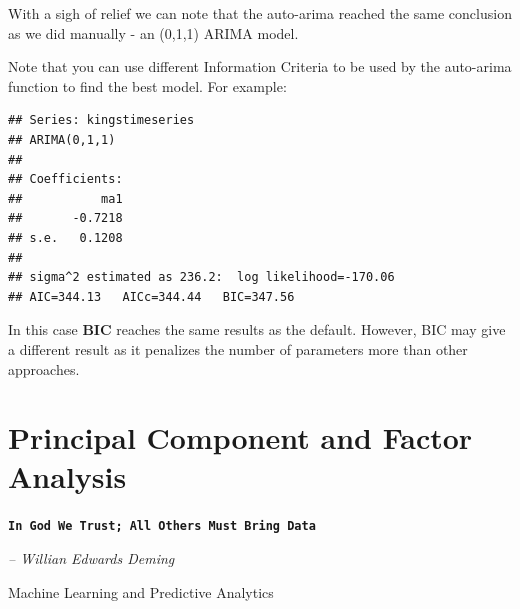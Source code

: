 \documentclass[11pt, letterpaper, twoside]{memoir}\usepackage{knitr}
\makeatletter
\newcommand{\chapterendsymbol}{
    \vspace{24pt}
    \Huge
    \hrulefill \hspace{0.1in} \floweroneleft\floweroneright \hspace{0.1in} \hrulefill
    \normalsize
    }
\renewcommand\part{%
  \if@openright
    \cleardoublepage
  \else
    \clearpage
  \fi
  \thispagestyle{empty}
  \null\vfil
  \secdef\@part\@spart
  }
\makeatother
\begin{document}
With a sigh of relief we can note that the auto-arima reached the same conclusion as we did manually - an (0,1,1) ARIMA model. 

Note that you can use different Information Criteria to be used by the auto-arima function to find the best model. For example:

\begin{knitrout}
\color{fgcolor}\begin{kframe}
\begin{alltt}
 \hlkwb{<-}  \hlstd{=}\hlstd{)}
\end{alltt}
\begin{verbatim}
## Series: kingstimeseries 
## ARIMA(0,1,1)                    
## 
## Coefficients:
##           ma1
##       -0.7218
## s.e.   0.1208
## 
## sigma^2 estimated as 236.2:  log likelihood=-170.06
## AIC=344.13   AICc=344.44   BIC=347.56
\end{verbatim}
\end{kframe}
\end{knitrout}

In this case \textbf{BIC} reaches the same results as the default. However, BIC may give a different result as it penalizes the number of parameters more than other approaches.

\chapterendsymbol





\chapter{Principal Component and Factor Analysis}

\begin{flushright}

\textbf{\texttt{In God We Trust; All Others Must Bring Data}}

\emph{-- Willian Edwards Deming}

\end{flushright}

\vspace{12pt}



\chapterendsymbol


\part{Machine Learning and Predictive Analytics}
\end{document}
